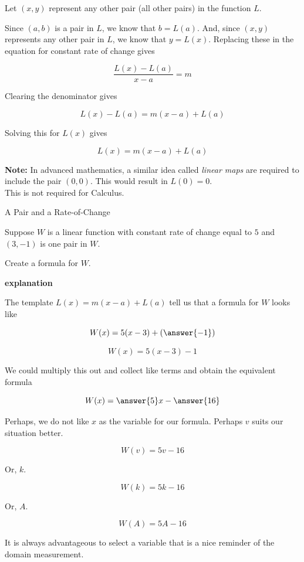 \documentclass{ximera}
\begin{document}
Let $(x, y)$ represent any other pair (all other pairs) in the function $L$. 






Since $(a, b)$ is a pair in $L$, we know that $b = L(a)$.  And, since $(x, y)$ represents any other pair in $L$, we know that $y = L(x)$.  Replacing these in the equation for constant rate of change gives


\[  \frac{L(x) - L(a)}{x-a} = m \]


Clearing the denominator gives


\[  L(x) - L(a) = m (x-a) + L(a)     \]

Solving this for $L(x)$ gives

\[  L(x) = m (x-a) + L(a)     \]



\textbf{Note:} In advanced mathematics, a similar idea called \textit{linear maps} are required to include the pair $(0,0)$.  This would result in $L(0) = 0$. \\  
This is not required for Calculus. 




\begin{example} A Pair and a Rate-of-Change


Suppose $W$ is a linear function with constant rate of change equal to $5$ and $(3, -1)$ is one pair in $W$.  

Create a formula for $W$.

\textbf{\textcolor{red!75!green}{explanation}} 

The template $L(x) = m (x-a) + L(a)$ tell us that a formula for $W$ looks like 


\[  W(x) = 5 (x-3) + \left(\answer{-1}\right)     \]


\[  W(x) = 5 (x-3) - 1     \]

We could multiply this out and collect like terms and obtain the equivalent formula


\[  W(x) = \answer{5}x - \answer{16}   \]



Perhaps, we do not like $x$ as the variable for our formula.  Perhaps $v$ suits our situation better.

\[  W(v) = 5v - 16   \]


Or, $k$.

\[  W(k) = 5k - 16   \]


Or, $A$.

\[  W(A) = 5A - 16   \]


It is always advantageous to select a variable that is a nice reminder of the domain measurement.

\end{example}
\end{document}

